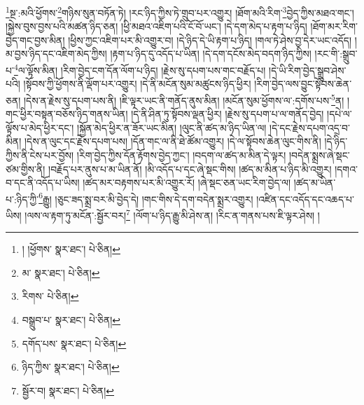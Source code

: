 \footnote{། །ཕྱོགས་  སྣར་ཐང་།  པེ་ཅིན། }སྔ་:མའི་ཕྱོགས་\footnote{མ་  སྣར་ཐང་།  པེ་ཅིན། }གཉིས་སུན་བཏོན་ཏེ། །རང་ཉིད་ཀྱིས་ཏེ་གྲུབ་པར་འགྱུར། །ཐོག་མའི་རིག་\footnote{རིགས་  པེ་ཅིན། }བྱེད་ཀྱིས་མཐའ་གང་། །སྐྱེས་བུས་བྱས་པའི་མཚན་ཉིད་ཅན། །ཕྱི་མཐའ་འཇིག་པའི་ངོ་བོ་ཡང་། །དེ་དག་མེད་པ་རྟག་པ་ཉིད། །ཐོག་མར་རིག་བྱེད་གང་བྱས་མིན། །ཕྱིས་ཀྱང་འཇིག་པར་མི་འགྱུར་བ། །དེ་ཉིད་དེ་ཡི་རྟག་པ་ཉིད། །གལ་ཏེ་ཤེས་བྱ་དེར་ཡང་འདོད། །མ་བྱས་ཉིད་དང་འཇིག་མེད་ཀྱིས། །རྟག་པ་ཉིད་དུ་འདོད་པ་ཡིན། །དེ་དག་དངོས་མེད་བདག་ཉིད་ཀྱིས། །རང་གི་:སྒྲུབ་པ་\footnote{བསྒྲུབ་པ་  སྣར་ཐང་།  པེ་ཅིན། }ལ་ལྟོས་མིན། །རིག་བྱེད་ངག་དོན་ལོག་པ་ཉིད། །རྗེས་སུ་དཔག་པས་གང་བརྗོད་པ། །དེ་ཡི་རིག་བྱེད་སྒྲུབ་ཤེས་པའི། །སྟོབས་ཀྱི་ཕྱོགས་ནི་ལྡོག་པར་འགྱུར། །དེ་ནི་མངོན་སུམ་མཚུངས་ཉིད་ཕྱིར། །རིག་བྱེད་ལས་བྱུང་སྟོབས་ཆེན་ཅན། །དེས་ན་རྗེས་སུ་དཔག་པས་ནི། །ཇི་ལྟར་ཡང་ནི་གནོད་ནུས་མིན། །མངོན་སུམ་ཕྱོགས་ལ་:དགོས་པས་\footnote{དགོད་པས་  སྣར་ཐང་།  པེ་ཅིན། }ན། །གང་ཕྱིར་བསྟན་བཅོས་ཉིད་གནས་ཡིན། །དེ་ནི་ཤིན་ཏུ་སྟོབས་ལྡན་ཕྱིར། །རྗེས་སུ་དཔག་པ་ལ་གནོད་བྱེད། །དཔེ་ལ་ལྟོས་པ་མེད་ཕྱིར་དང་། །སྐྱོན་མེད་ཕྱིར་ན་ཟོར་ཡང་མིན། །ལུང་ནི་ཚད་མ་ཉིད་ཡིན་ལ། །དེ་དང་རྗེས་དཔག་འདྲ་བ་མིན། །དེས་ན་ལུང་དང་རྗེས་དཔག་པས། །དོན་གང་ལ་ནི་ཐེ་ཚོམ་འགྱུར། །དེ་ལ་སྟོབས་ཆེན་ལུང་གིས་ནི། །དེ་ཉིད་ཀྱིས་ནི་ངེས་པར་བྱོས། །རིག་བྱེད་ཀྱིས་དོན་རྟོགས་བྱེད་ཀྱང་། །བདག་ལ་ཚད་མ་མིན་དེ་ལྟར། །བདེན་སྨྲས་ཞེ་སྡང་ཙམ་གྱིས་ནི། །བརྗོད་པར་ནུས་པ་མ་ཡིན་ནོ། །མི་འདོད་པ་དང་ཞེ་སྡང་གིས། །ཚད་མ་མིན་པ་ཉིད་མི་འགྱུར། །དགའ་བ་དང་ནི་འདོད་པ་ཡིས། །ཚད་མར་བརྟགས་པར་མི་འགྱུར་རོ། །ཞེ་སྡང་ཅན་ཡང་རིག་བྱེད་ལ། །ཚད་མ་ཡིན་པ་:ཉིད་ཀྱི་\footnote{ཉིད་ཀྱིས་  སྣར་ཐང་།  པེ་ཅིན། }རྒྱུ། །ཅུང་ཟད་སྨྲ་བར་མི་བྱེད་དེ། །གང་གིས་དེ་དག་བདེན་སྨྲར་འགྱུར། །འཛིན་དང་འདོད་དང་འཆད་པ་ཡིས། །ལས་ལ་རྟག་ཏུ་མངོན་:སྦྱོར་བར།\footnote{སྦྱོར་བ།  སྣར་ཐང་།  པེ་ཅིན། } །ལོག་པ་ཉིད་རྒྱུ་མི་ཤེས་ན། །རིང་ན་གནས་པས་ཇི་ལྟར་ཤེས། །
